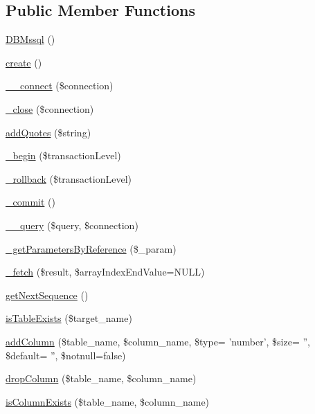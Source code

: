 \subsection*{Public Member Functions}
\begin{DoxyCompactItemize}
\item 
\hyperlink{classDBMssql_a308e7ed895b32bedb958b2fa946fb499}{D\+B\+Mssql} ()
\item 
\hyperlink{classDBMssql_a1be3ce3432e43e0a5080ada450971345}{create} ()
\item 
\hyperlink{classDBMssql_a369f968ee79e1eb30e5d640c2294a7d1}{\+\_\+\+\_\+connect} (\$connection)
\item 
\hyperlink{classDBMssql_a64f2fc08d576cdcfc0dd3a80343a0e5a}{\+\_\+close} (\$connection)
\item 
\hyperlink{classDBMssql_ac380f1918abd17fd5cba28accfaec9fc}{add\+Quotes} (\$string)
\item 
\hyperlink{classDBMssql_a28ba9e00e3fce08dfabc334a1365fd5a}{\+\_\+begin} (\$transaction\+Level)
\item 
\hyperlink{classDBMssql_a36d00363d093e06fe3db4dbce6e8beaf}{\+\_\+rollback} (\$transaction\+Level)
\item 
\hyperlink{classDBMssql_a08f359cc1c5ce91fde7139446252e8c4}{\+\_\+commit} ()
\item 
\hyperlink{classDBMssql_aa2d0d2f6680d70399f493b567d94ed92}{\+\_\+\+\_\+query} (\$query, \$connection)
\item 
\hyperlink{classDBMssql_a09c8011c16ac2e01c6fca9d6f0e6b7f6}{\+\_\+get\+Parameters\+By\+Reference} (\$\+\_\+param)
\item 
\hyperlink{classDBMssql_aed12cc502a2d8ee9ce8821af12d45b9e}{\+\_\+fetch} (\$result, \$array\+Index\+End\+Value=N\+U\+L\+L)
\item 
\hyperlink{classDBMssql_ad4342b7988253c6bbeec102b2c454659}{get\+Next\+Sequence} ()
\item 
\hyperlink{classDBMssql_add743e9c5148edf4f393209b1f4b9cd6}{is\+Table\+Exists} (\$target\+\_\+name)
\item 
\hyperlink{classDBMssql_a4a5a3cc78312f22673d7e3a4d1a5c8cf}{add\+Column} (\$table\+\_\+name, \$column\+\_\+name, \$type= 'number', \$size= '', \$default= '', \$notnull=false)
\item 
\hyperlink{classDBMssql_a802707618ed283cd4143c82972b3ade5}{drop\+Column} (\$table\+\_\+name, \$column\+\_\+name)
\item 
\hyperlink{classDBMssql_a5a96979e7fed50503b902d2983fa507a}{is\+Column\+Exists} (\$table\+\_\+name, \$column\+\_\+name)

\end{DoxyCompactItemize}
